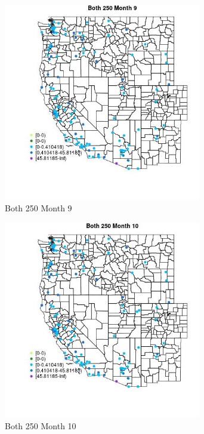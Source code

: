 \begin{figure} 
\centering  
\includegraphics[width=0.77\textwidth]{Code_Outputs/Report_ML_input_PM25_Step4_part_e_de_duplicated_aves_MapObsMo9Both_250.jpg} 
\caption{\label{fig:Report_ML_input_PM25_Step4_part_e_de_duplicated_avesMapObsMo9Both_250}Both 250 Month 9} 
\end{figure} 
 

\begin{figure} 
\centering  
\includegraphics[width=0.77\textwidth]{Code_Outputs/Report_ML_input_PM25_Step4_part_e_de_duplicated_aves_MapObsMo10Both_250.jpg} 
\caption{\label{fig:Report_ML_input_PM25_Step4_part_e_de_duplicated_avesMapObsMo10Both_250}Both 250 Month 10} 
\end{figure} 
 

